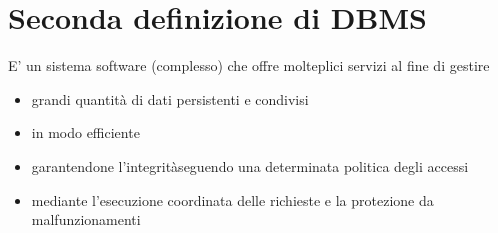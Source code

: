\documentclass[12pt]{article}
\begin{document}
\section{Seconda definizione di DBMS}
E' un sistema software (complesso) che offre molteplici servizi al fine di gestire
\begin{itemize}
    \item grandi quantità di dati persistenti e condivisi
    \item in modo efficiente
    \item garantendone l'integritàseguendo una determinata politica degli accessi
    \item mediante l'esecuzione coordinata delle richieste e la protezione da malfunzionamenti
\end{itemize}
\end{document}
